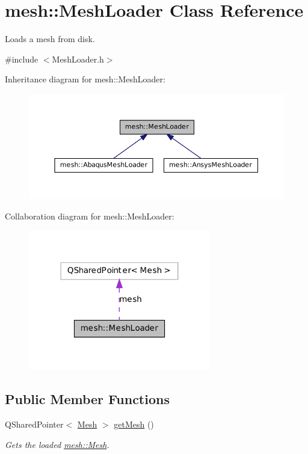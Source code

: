 \hypertarget{classmesh_1_1_mesh_loader}{
\section{mesh::MeshLoader Class Reference}
\label{classmesh_1_1_mesh_loader}
}


Loads a mesh from disk.  




{\ttfamily \#include $<$MeshLoader.h$>$}



Inheritance diagram for mesh::MeshLoader:\nopagebreak
\begin{figure}[H]
\begin{center}
\leavevmode
\includegraphics[width=388pt]{classmesh_1_1_mesh_loader__inherit__graph}
\end{center}
\end{figure}


Collaboration diagram for mesh::MeshLoader:\nopagebreak
\begin{figure}[H]
\begin{center}
\leavevmode
\includegraphics[width=226pt]{classmesh_1_1_mesh_loader__coll__graph}
\end{center}
\end{figure}
\subsection*{Public Member Functions}
\begin{DoxyCompactItemize}
\item 
QSharedPointer$<$ \hyperlink{classmesh_1_1_mesh}{Mesh} $>$ \hyperlink{classmesh_1_1_mesh_loader_a9756af06988db1e1e4a1d8ad1c44b719}{getMesh} ()
\begin{DoxyCompactList}\small\item\em Gets the loaded \hyperlink{classmesh_1_1_mesh}{mesh::Mesh}. \item\end{DoxyCompactList}\end{DoxyCompactItemize}
